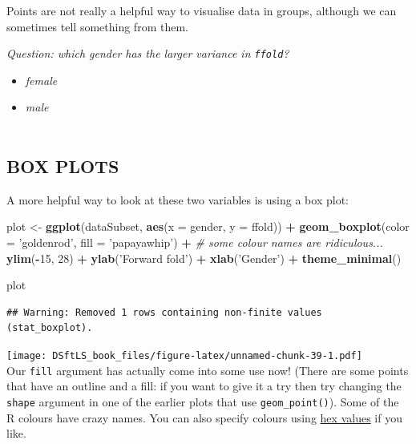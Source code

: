 \documentclass[
]{book}
\newenvironment{Shaded}{\begin{snugshade}}{\end{snugshade}}
\newcommand{\CommentTok}[1]{\textcolor[rgb]{0.56,0.35,0.01}{\textit{#1}}}
\newcommand{\DataTypeTok}[1]{\textcolor[rgb]{0.13,0.29,0.53}{#1}}
\newcommand{\DecValTok}[1]{\textcolor[rgb]{0.00,0.00,0.81}{#1}}
\newcommand{\KeywordTok}[1]{\textcolor[rgb]{0.13,0.29,0.53}{\textbf{#1}}}
\newcommand{\NormalTok}[1]{#1}
\newcommand{\OperatorTok}[1]{\textcolor[rgb]{0.81,0.36,0.00}{\textbf{#1}}}
\newcommand{\StringTok}[1]{\textcolor[rgb]{0.31,0.60,0.02}{#1}}
\providecommand{\tightlist}{%
  \setlength{\itemsep}{0pt}\setlength{\parskip}{0pt}}
\begin{document}
Points are not really a helpful way to visualise data in groups, although
we can sometimes tell something from them.

\emph{Question: which gender has the larger variance in \texttt{ffold}?}

\begin{itemize}
\tightlist
\item
  \emph{female}
\item
  \emph{male}\\
  ~\\
\end{itemize}

\hypertarget{box-plots}{%
\subsection{BOX PLOTS}\label{box-plots}}

A more helpful way to look at these two variables is using a box plot:

\begin{Shaded}
\begin{Highlighting}[]
\NormalTok{plot <-}\StringTok{ }\KeywordTok{ggplot}\NormalTok{(dataSubset, }\KeywordTok{aes}\NormalTok{(}\DataTypeTok{x =}\NormalTok{ gender, }\DataTypeTok{y =}\NormalTok{ ffold)) }\OperatorTok{+}
\StringTok{    }\KeywordTok{geom_boxplot}\NormalTok{(}\DataTypeTok{color =} \StringTok{'goldenrod'}\NormalTok{, }\DataTypeTok{fill =} \StringTok{'papayawhip'}\NormalTok{) }\OperatorTok{+}\StringTok{ }
\StringTok{        }\CommentTok{# some colour names are ridiculous...}
\StringTok{    }\KeywordTok{ylim}\NormalTok{(}\OperatorTok{-}\DecValTok{15}\NormalTok{, }\DecValTok{28}\NormalTok{) }\OperatorTok{+}\StringTok{ }\KeywordTok{ylab}\NormalTok{(}\StringTok{'Forward fold'}\NormalTok{) }\OperatorTok{+}\StringTok{ }\KeywordTok{xlab}\NormalTok{(}\StringTok{'Gender'}\NormalTok{) }\OperatorTok{+}
\StringTok{    }\KeywordTok{theme_minimal}\NormalTok{()}

\NormalTok{plot}
\end{Highlighting}
\end{Shaded}

\begin{verbatim}
## Warning: Removed 1 rows containing non-finite values (stat_boxplot).
\end{verbatim}

\texttt{[image: DSftLS\_book\_files/figure-latex/unnamed-chunk-39-1.pdf]}\\

Our \texttt{fill} argument has actually come into some use now! (There are some
points that have an outline and a fill: if you want to give it a try then try
changing the \texttt{shape} argument in one of the earlier plots that use
\texttt{geom\_point()}). Some of the R colours have crazy names. You can also specify
colours using \href{https://www.w3schools.com/colors/colors_picker.asp}{hex values}
if you like.
\end{document}
